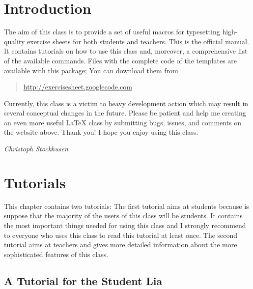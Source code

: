 \documentclass[a4paper,fleqn]{report}
\let\sffamily=\rmfamily
\def\exercisesheet{{exercisesheet}}
\begin{document}



\chapter*{Introduction}

The aim of this class is to provide a set of useful macros for
typesetting high-quality exercise sheets for both students and
teachers. This is the official manual. It contains tutorials on how to
use this class and, moreover, a comprehensive list of the available
commands. Files with the complete code of the templates are available
with this package; You can download them from 
\begin{quote}
  \url{http://exercisesheet.googlecode.com} 
\end{quote}
Currently, this class is a victim to heavy development action which
may result in several conceptual changes in the future. Please be
patient and help me creating an even more useful \LaTeX{} class by
submitting bugs, issues, and comments on the website above. Thank you!
I hope you enjoy using this class.

\medskip\hfill{\itshape Christoph Stockhusen}


\tableofcontents


\chapter{Tutorials}

This chapter contains two tutorials: The first tutorial aims at
students because is suppose that the majority of the users of this
class will be students. It contains the most important things needed
for using this class and I strongly recommend to everyone who uses
this class to read this tutorial at least once. The second tutorial
aims at teachers and gives more detailed information about the more
sophisticated features of this class.


\section{A Tutorial for the Student Lia}
\end{document}
